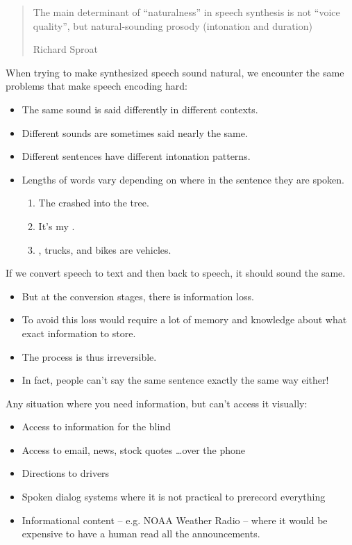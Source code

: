 \documentclass[a4paper,landscape,headrule,footrule,xetex]{foils}
\begin{document}
\begin{quote}
  The main determinant of ``naturalness'' in speech synthesis is not
  ``voice quality'', but natural-sounding prosody (intonation and
  duration) 
  \begin{flushright}
    Richard Sproat
  \end{flushright}
\end{quote}

 When trying to make synthesized
speech sound natural, we encounter the same problems that make
speech encoding hard:

\begin{itemize}
\item The same sound is said differently in different contexts.
\item Different sounds are sometimes said nearly the same.
\item Different sentences have different intonation patterns. 
\item Lengths of words vary depending on where in the sentence they are spoken. 
    \begin{enumerate}
    \item The  crashed into the tree.
    \item It's my .
    \item {}, trucks, and bikes are vehicles.
    \end{enumerate}
  \end{itemize}







If we convert speech to text and then back to speech, it should sound the same.
\begin{itemize}
\item  But at the conversion stages, there is information loss.
\item To avoid this loss would require a lot of memory and knowledge about what exact information to store.
\item The process is thus irreversible.
\item In fact, people can't say the same sentence exactly the same way either!
\end{itemize}

Any situation where you need information, but can't access it visually:

\begin{itemize}
\item Access to information for the blind
\item Access to email, news, stock quotes \ldots over the phone
\item Directions to drivers
\item Spoken dialog systems where it is not practical to prerecord everything
\item Informational content – e.g. NOAA Weather Radio – where it would be expensive to have a human read all the announcements.
\end{itemize}
\end{document}
